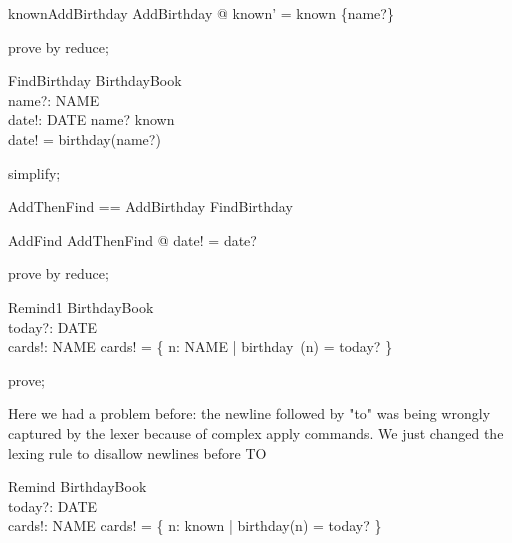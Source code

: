 \begin{theorem}{knownAddBirthday}
\forall AddBirthday @ known' = known \cup  \{name?\}
\end{theorem}

\begin{zproof}[knownAddBirthday]
prove by reduce;
\end{zproof}

\begin{schema}{FindBirthday}
  \Xi BirthdayBook\\
  name?: NAME\\
  date!: DATE
\where
  name? \in  known\\
  date! = birthday(name?)
\end{schema}

\begin{zproof}
simplify;
\end{zproof}

\begin{zed}
AddThenFind == AddBirthday \semi  FindBirthday
\end{zed}

\begin{theorem}{AddFind}
\forall AddThenFind @ date! = date?
\end{theorem}

\begin{zproof}[AddFind]
prove by reduce;
\end{zproof}

\begin{schema}{Remind1}
  \Xi BirthdayBook\\
  today?: DATE\\
  cards!: \power  NAME
\where
  cards! = \{  n: NAME | birthday~(n) = today? \}
\end{schema}

\begin{zproof}
prove;
\end{zproof}

Here we had a problem before: the newline followed by "to" was being wrongly
captured by the lexer because of complex apply commands. We just changed the
lexing rule to disallow newlines before TO
\begin{schema}{Remind}
  \Xi BirthdayBook \\
  today?: DATE\\
  cards!: \power  NAME
\where
  cards! = \{  n: known | birthday(n) = today? \}
\end{schema}

